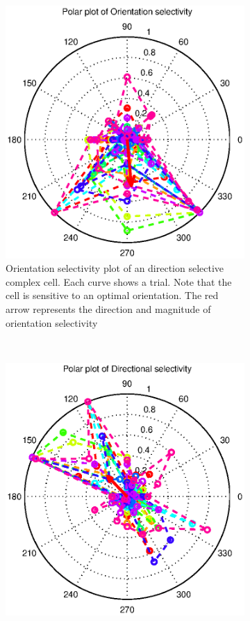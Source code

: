 \documentclass[11pt]{article}
\newcommand{\rulesep}{\unskip\ \vrule\ }
\begin{document}
\begin{enumerate}
\begin{figure}
\begin{subfigure}{.48\textwidth}
            \includegraphics[width=\linewidth]{plots/max_dircirvar_ori}
            \caption{Orientation selectivity plot of an direction selective complex cell. Each curve shows a trial. Note that the cell is sensitive to an optimal orientation. The red arrow represents the direction and magnitude of orientation selectivity}
        \end{subfigure}
        \rulesep
        \begin{subfigure}{.48\textwidth}
            \centering
            \includegraphics[width=\linewidth]{plots/max_dircirvar_dir}

\end{subfigure}
\end{figure}
\end{enumerate}
\end{document}

